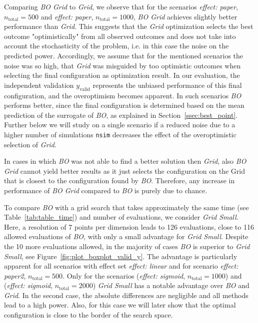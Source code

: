 \documentclass[bimj,fleqn]{w-art}
\theoremstyle{plain}
\theoremstyle{definition}
\begin{document}
Comparing \emph{BO Grid} to \emph{Grid}, we observe that for the scenarios \emph{effect: paper}, $n_{\text{total}} = 500$ and \emph{effect: paper}, $n_{\text{total}} = 1000$, \emph{BO Grid} achieves slightly better performance than \emph{Grid}.
This suggests that the \emph{Grid} optimization selects the best outcome "optimistically" from all observed outcomes and does not take into account the stochasticity of the problem, i.e. in this case the noise on the predicted power. 
Accordingly, we assume that for the mentioned scenarios the noise was so high, that \emph{Grid} was misguided by too optimistic outcomes when selecting the final configuration as optimization result.
In our evaluation, the independent validation $y_{\text{valid}}$ represents the unbiased performance of this final configuration, and the overoptimism becomes apparent.
In such scenarios \emph{BO} performs better, since the final configuration is determined based on the mean prediction of the surrogate of \emph{BO}, as explained in Section~\ref{ssec:best_point}.
Further below we will study on a single scenario if a reduced noise due to a higher number of simulations \texttt{nsim} decreases the effect of the overoptimistic selection of \emph{Grid}.

In cases in which \emph{BO} was not able to find a better solution then \emph{Grid}, also \emph{BO Grid} cannot yield better results as it just selects the configuration on the Grid that is closest to the configuration found by \emph{BO}.
Therefore, any increase in performance of \emph{BO Grid} compared to \emph{BO} is purely due to chance.

To compare \emph{BO} with a grid search that takes approximately the same time (see Table~\ref{tab:table_time}) and number of evaluations, we consider \emph{Grid Small}.
Here, a resolution of 7 points per dimension leads to 126 evaluations, close to 116 allowed evaluations of \emph{BO}, with only a small advantage for \emph{Grid Small}.
Despite the 10 more evaluations allowed, in the majority of cases \emph{BO} is superior to \emph{Grid Small}, see Figure~\ref{fig:plot_boxplot_valid_y}.
The advantage is particularly apparent for all scenarios with effect set \emph{effect: linear} and for scenario \emph{effect: paper2}, $n_{\text{total}} = 500$.
Only for the scenarios (\emph{effect: sigmoid}, $n_{\text{total}} = 1000$) and (\emph{effect: sigmoid}, $n_{\text{total}} = 2000$) \emph{Grid Small} has a notable advantage over \emph{BO} and \emph{Grid}.
In the second case, the absolute differences are negligible and all methods lead to a high power.
Also, for this case we will later show that the optimal configuration is close to the border of the search space.
\end{document}
